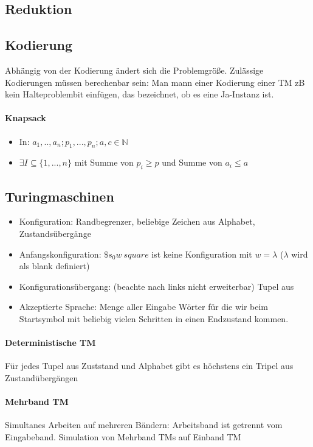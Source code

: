 \documentclass[ngerman]{scrartcl}
\begin{document}
\subsection{Reduktion}


\subsection{Kodierung}
Abhängig von der Kodierung ändert sich die Problemgröße. Zulässige Kodierungen müssen berechenbar sein: Man mann einer Kodierung einer TM zB kein Halteproblembit einfügen, das bezeichnet, ob es eine Ja-Instanz ist.
\paragraph{Knapsack} 
\begin{itemize}
    \item In: $ a_1,..,a_n; p_1,...,p_n; a,c \in \mathbb{N} $
    \item $ \exists I \subseteq \{ 1,...,n \} $ mit Summe von $ p_i \geq p$ und Summe von $ a_i \leq a$
\end{itemize}

\subsection{Turingmaschinen}
\begin{itemize}
    \item Konfiguration: Randbegrenzer, beliebige Zeichen aus Alphabet, Zustandsübergänge
    \item Anfangskonfiguration: $ \$ s_0 w\ square $ ist keine Konfiguration mit $ w = \lambda $ ($ \lambda $ wird als blank definiert)
    \item Konfigurationsübergang: (beachte nach links nicht erweiterbar) Tupel aus 
    \item Akzeptierte Sprache: Menge aller Eingabe Wörter für die wir beim Startsymbol mit beliebig vielen Schritten in einen Endzustand kommen.
\end{itemize}

\paragraph{Deterministische TM} Für jedes Tupel aus Zuststand und Alphabet gibt es höchstens ein Tripel aus Zustandübergängen

\paragraph{Mehrband TM} Simultanes Arbeiten auf mehreren Bändern: Arbeitsband ist getrennt vom Eingabeband. Simulation von Mehrband TMs auf Einband TM
\end{document}
